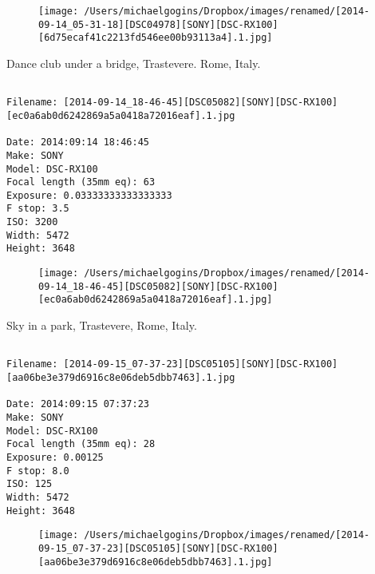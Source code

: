 \begin{figure}
\texttt{[image: /Users/michaelgogins/Dropbox/images/renamed/[2014-09-14\_05-31-18][DSC04978][SONY][DSC-RX100][6d75ecaf41c2213fd546ee00b93113a4].1.jpg]}
\end{figure}
    
\clearpage
\onecolumn
\noindent Dance club under a bridge, Trastevere. Rome, Italy.
\noindent
\begin{lstlisting}

Filename: [2014-09-14_18-46-45][DSC05082][SONY][DSC-RX100][ec0a6ab0d6242869a5a0418a72016eaf].1.jpg

Date: 2014:09:14 18:46:45
Make: SONY
Model: DSC-RX100
Focal length (35mm eq): 63
Exposure: 0.03333333333333333
F stop: 3.5
ISO: 3200
Width: 5472
Height: 3648
\end{lstlisting}
\clearpage

\begin{figure}
\texttt{[image: /Users/michaelgogins/Dropbox/images/renamed/[2014-09-14\_18-46-45][DSC05082][SONY][DSC-RX100][ec0a6ab0d6242869a5a0418a72016eaf].1.jpg]}
\end{figure}
    
\clearpage
\onecolumn
\noindent Sky in a park, Trastevere, Rome, Italy.
\noindent
\begin{lstlisting}

Filename: [2014-09-15_07-37-23][DSC05105][SONY][DSC-RX100][aa06be3e379d6916c8e06deb5dbb7463].1.jpg

Date: 2014:09:15 07:37:23
Make: SONY
Model: DSC-RX100
Focal length (35mm eq): 28
Exposure: 0.00125
F stop: 8.0
ISO: 125
Width: 5472
Height: 3648
\end{lstlisting}
\clearpage

\begin{figure}
\texttt{[image: /Users/michaelgogins/Dropbox/images/renamed/[2014-09-15\_07-37-23][DSC05105][SONY][DSC-RX100][aa06be3e379d6916c8e06deb5dbb7463].1.jpg]}
\end{figure}
    
